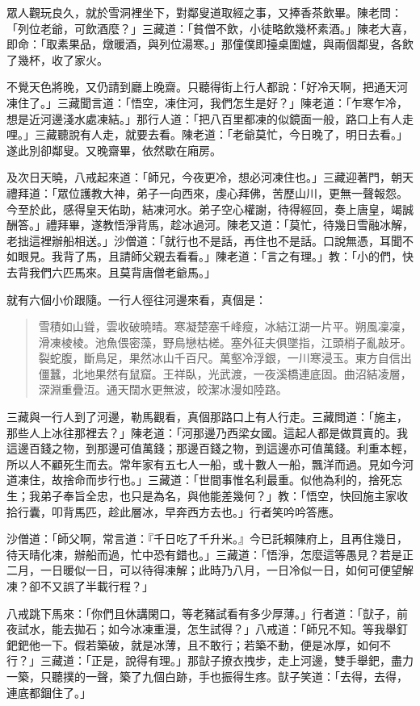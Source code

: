 眾人觀玩良久，就於雪洞裡坐下，對鄰叟道取經之事，又捧香茶飲畢。陳老問：「列位老爺，可飲酒麼？」三藏道：「貧僧不飲，小徒略飲幾杯素酒。」陳老大喜，即命：「取素果品，燉暖酒，與列位湯寒。」那僮僕即擡桌圍爐，與兩個鄰叟，各飲了幾杯，收了家火。

不覺天色將晚，又仍請到廳上晚齋。只聽得街上行人都說：「好冷天啊，把通天河凍住了。」三藏聞言道：「悟空，凍住河，我們怎生是好？」陳老道：「乍寒乍冷，想是近河邊淺水處凍結。」那行人道：「把八百里都凍的似鏡面一般，路口上有人走哩。」三藏聽說有人走，就要去看。陳老道：「老爺莫忙，今日晚了，明日去看。」遂此別卻鄰叟。又晚齋畢，依然歇在廂房。

及次日天曉，八戒起來道：「師兄，今夜更冷，想必河凍住也。」三藏迎著門，朝天禮拜道：「眾位護教大神，弟子一向西來，虔心拜佛，苦歷山川，更無一聲報怨。今至於此，感得皇天佑助，結凍河水。弟子空心權謝，待得經回，奏上唐皇，竭誠酬答。」禮拜畢，遂教悟淨背馬，趁冰過河。陳老又道：「莫忙，待幾日雪融冰解，老拙這裡辦船相送。」沙僧道：「就行也不是話，再住也不是話。口說無憑，耳聞不如眼見。我背了馬，且請師父親去看看。」陳老道：「言之有理。」教：「小的們，快去背我們六匹馬來。且莫背唐僧老爺馬。」

就有六個小价跟隨。一行人徑往河邊來看，真個是：
\begin{quote}
雪積如山聳，雲收破曉晴。寒凝楚塞千峰瘦，冰結江湖一片平。朔風凜凜，滑凍棱棱。池魚偎密藻，野鳥戀枯槎。塞外征夫俱墜指，江頭梢子亂敲牙。裂蛇腹，斷鳥足，果然冰山千百尺。萬壑冷浮銀，一川寒浸玉。東方自信出僵蠶，北地果然有鼠窟。王祥臥，光武渡，一夜溪橋連底固。曲沼結凌層，深淵重疊沍。通天闊水更無波，皎潔冰漫如陸路。
\end{quote}

三藏與一行人到了河邊，勒馬觀看，真個那路口上有人行走。三藏問道：「施主，那些人上冰往那裡去？」陳老道：「河那邊乃西梁女國。這起人都是做買賣的。我這邊百錢之物，到那邊可值萬錢；那邊百錢之物，到這邊亦可值萬錢。利重本輕，所以人不顧死生而去。常年家有五七人一船，或十數人一船，飄洋而過。見如今河道凍住，故捨命而步行也。」三藏道：「世間事惟名利最重。似他為利的，捨死忘生；我弟子奉旨全忠，也只是為名，與他能差幾何？」教：「悟空，快回施主家收拾行囊，叩背馬匹，趁此層冰，早奔西方去也。」行者笑吟吟答應。

沙僧道：「師父啊，常言道：『千日吃了千升米。』今已託賴陳府上，且再住幾日，待天晴化凍，辦船而過，忙中恐有錯也。」三藏道：「悟淨，怎麼這等愚見？若是正二月，一日暖似一日，可以待得凍解；此時乃八月，一日冷似一日，如何可便望解凍？卻不又誤了半載行程？」

八戒跳下馬來：「你們且休講閑口，等老豬試看有多少厚薄。」行者道：「獃子，前夜試水，能去拋石；如今冰凍重漫，怎生試得？」八戒道：「師兄不知。等我舉釘鈀鈀他一下。假若築破，就是冰薄，且不敢行；若築不動，便是冰厚，如何不行？」三藏道：「正是，說得有理。」那獃子撩衣拽步，走上河邊，雙手舉鈀，盡力一築，只聽撲的一聲，築了九個白跡，手也振得生疼。獃子笑道：「去得，去得，連底都錮住了。」

